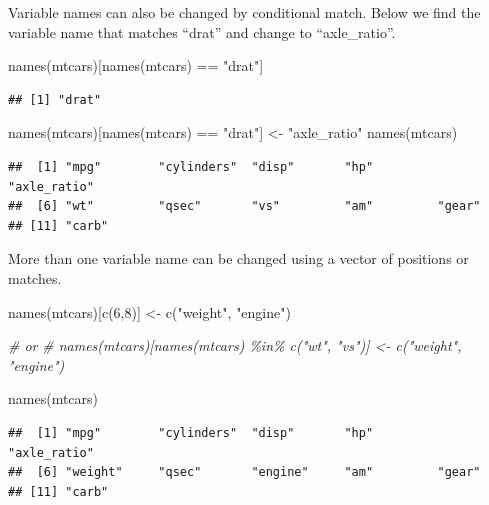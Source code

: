 \documentclass[
]{book}
\newenvironment{Shaded}{\begin{snugshade}}{\end{snugshade}}
\newcommand{\CommentTok}[1]{\textcolor[rgb]{0.56,0.35,0.01}{\textit{#1}}}
\newcommand{\DecValTok}[1]{\textcolor[rgb]{0.00,0.00,0.81}{#1}}
\newcommand{\FunctionTok}[1]{\textcolor[rgb]{0.00,0.00,0.00}{#1}}
\newcommand{\NormalTok}[1]{#1}
\newcommand{\OtherTok}[1]{\textcolor[rgb]{0.56,0.35,0.01}{#1}}
\newcommand{\SpecialCharTok}[1]{\textcolor[rgb]{0.00,0.00,0.00}{#1}}
\newcommand{\StringTok}[1]{\textcolor[rgb]{0.31,0.60,0.02}{#1}}
\begin{document}
Variable names can also be changed by conditional match. Below we find the variable name that matches ``drat'' and change to ``axle\_ratio''.

\begin{Shaded}
\begin{Highlighting}[]
\FunctionTok{names}\NormalTok{(mtcars)[}\FunctionTok{names}\NormalTok{(mtcars) }\SpecialCharTok{==} \StringTok{"drat"}\NormalTok{]}
\end{Highlighting}
\end{Shaded}

\begin{verbatim}
## [1] "drat"
\end{verbatim}

\begin{Shaded}
\begin{Highlighting}[]
\FunctionTok{names}\NormalTok{(mtcars)[}\FunctionTok{names}\NormalTok{(mtcars) }\SpecialCharTok{==} \StringTok{"drat"}\NormalTok{] }\OtherTok{\textless{}{-}} \StringTok{"axle\_ratio"}
\FunctionTok{names}\NormalTok{(mtcars)}
\end{Highlighting}
\end{Shaded}

\begin{verbatim}
##  [1] "mpg"        "cylinders"  "disp"       "hp"         "axle_ratio"
##  [6] "wt"         "qsec"       "vs"         "am"         "gear"      
## [11] "carb"
\end{verbatim}

More than one variable name can be changed using a vector of positions or matches.

\begin{Shaded}
\begin{Highlighting}[]
\FunctionTok{names}\NormalTok{(mtcars)[}\FunctionTok{c}\NormalTok{(}\DecValTok{6}\NormalTok{,}\DecValTok{8}\NormalTok{)] }\OtherTok{\textless{}{-}} \FunctionTok{c}\NormalTok{(}\StringTok{"weight"}\NormalTok{, }\StringTok{"engine"}\NormalTok{)}

\CommentTok{\# or}
\CommentTok{\# names(mtcars)[names(mtcars) \%in\% c("wt", "vs")] \textless{}{-} c("weight", "engine")}

\FunctionTok{names}\NormalTok{(mtcars)}
\end{Highlighting}
\end{Shaded}

\begin{verbatim}
##  [1] "mpg"        "cylinders"  "disp"       "hp"         "axle_ratio"
##  [6] "weight"     "qsec"       "engine"     "am"         "gear"      
## [11] "carb"
\end{verbatim}
\end{document}
